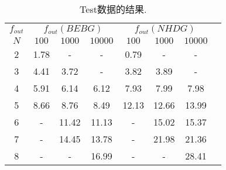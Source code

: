 \begin{table}[tb!]
	\centering
	\caption{Test数据的结果.}
	\begin{tabular}{cccccccc}
		\toprule
		$f_{out}$ & \multicolumn{3}{c}{$f_{out}(BEBG)$} & \multicolumn{3}{c}{$f_{out}(NHDG)$}                                      \\
		$N$       & $100$                               & $1000$                              & $10000$ & $100$ & $1000$ & $10000$ \\
		\midrule
		2         & 1.78                                & -                                   & -       & 0.79  & -      & -       \\
		3         & 4.41                                & 3.72                                & -       & 3.82  & 3.89   & -       \\
		4         & 5.91                                & 6.14                                & 6.12    & 7.93  & 7.99   & 7.98    \\
		5         & 8.66                                & 8.76                                & 8.49    & 12.13 & 12.66  & 13.99   \\
		6         & -                                   & 11.42                               & 11.13   & -     & 15.02  & 15.37   \\
		7         & -                                   & 14.45                               & 13.78   & -     & 21.98  & 21.36   \\
		8         & -                                   & -                                   & 16.99   & -     & -      & 28.41   \\
		\bottomrule
	\end{tabular}
	\label{table:con-test}
\end{table}

